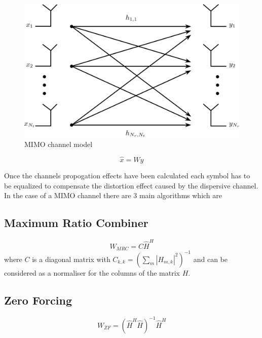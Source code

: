 \begin{figure}[H]
    \begin{center}
        \includegraphics[width=\linewidth]{images/MIMO_Illustration.jpg}
        \caption{MIMO channel model}
        \label{fig:MIMOChannel}
    \end{center}
\end{figure}

\begin{equation}
    \hat{x} = Wy
\end{equation}

Once the channels propogation effects have been calculated each symbol has to be equalized to compensate the distortion effect caused by the dispersive channel. In the case of a MIMO channel there are 3 main algorithms which are

\subsection{Maximum Ratio Combiner}\label{ssec:Simple}

\begin{equation}
    W_{MRC} = C\hat{H}^H
\end{equation}
where $C$ is a diagonal matrix with 
$
C_{k,k} = \left ( \sum_{m}\left | H_{m,k} \right |^2 \right )^{-1}
$
and can be considered as a normaliser for the columns of the matrix $H$.

\subsection{Zero Forcing}\label{ssec:ZF}


\begin{equation}
    W_{ZF} = (\hat{H}^H\hat{H})^{-1}\hat{H}^H
\end{equation}

